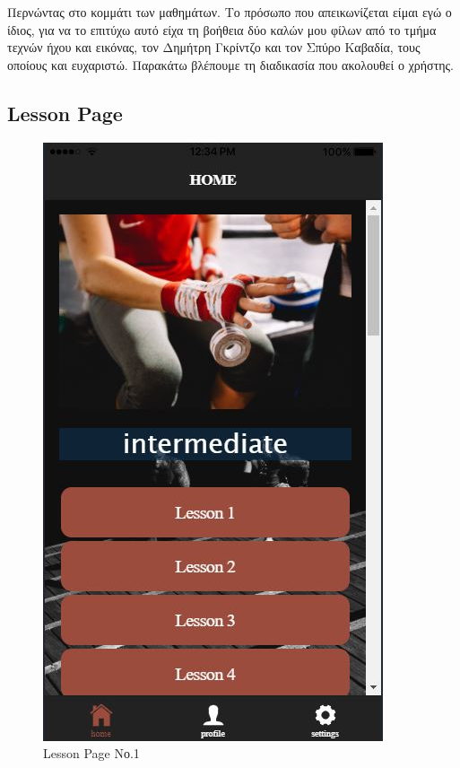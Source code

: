 \documentclass[a4paper,12pt]{article}
\begin{document}
			Περνώντας στο κομμάτι των μαθημάτων. Το πρόσωπο που απεικωνίζεται είμαι εγώ ο ίδιος, για να το επιτύχω αυτό είχα τη βοήθεια δύο καλών μου φίλων από το τμήμα τεχνών ήχου και εικόνας,
			τον Δημήτρη Γκρίντζο και τον Σπύρο Καβαδία, τους οποίους και ευχαριστώ. Παρακάτω βλέπουμε τη διαδικασία που ακολουθεί ο χρήστης.
			\subsection{Lesson Page}
			\clearpage
			\begin{figure}[!htb]
				\caption{Lesson Page Νο.1}
				\vspace*{0.5cm}

				  \includegraphics[width=\linewidth]{home2}
				  

\end{figure}
\end{document}
